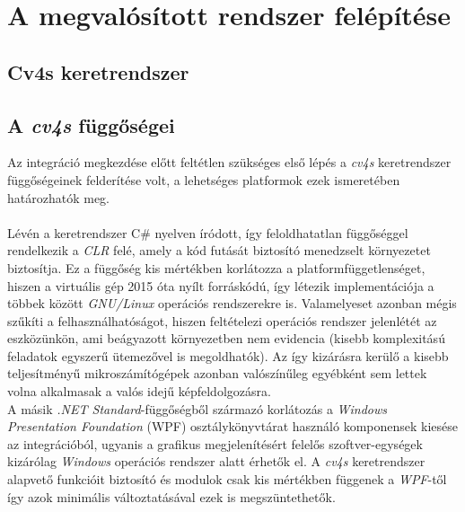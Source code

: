 \chapter{A megvalósított rendszer felépítése} \label{architektura_fejezet}

\section{Cv4s keretrendszer} \label{cv4s_keretrendszer}

\section{A \emph{cv4s} függőségei} \label{fuggosegek}

Az integráció megkezdése előtt feltétlen szükséges első lépés a \emph{cv4s} keretrendszer függőségeinek felderítése volt, a lehetséges platformok ezek ismeretében határozhatók meg. \\
\\
Lévén a keretrendszer C\# nyelven íródott, így feloldhatatlan függőséggel rendelkezik a \textit{CLR} felé, amely a kód futását biztosító menedzselt környezetet biztosítja. Ez a függőség kis mértékben korlátozza a platformfüggetlenséget, hiszen a virtuális gép 2015 óta nyílt forráskódú, így létezik implementációja a többek között \emph{GNU/Linux} operációs rendszerekre is. Valamelyeset azonban mégis szűkíti a felhasználhatóságot, hiszen feltételezi operációs rendszer jelenlétét az eszközünkön, ami beágyazott környezetben nem evidencia (kisebb komplexitású feladatok egyszerű ütemezővel is megoldhatók). Az így kizárásra kerülő a kisebb teljesítményű mikroszámítógépek azonban valószínűleg egyébként sem lettek volna alkalmasak a valós idejű képfeldolgozásra. \\
A másik \emph{.NET Standard}-függőségből származó korlátozás a \textit{Windows Presentation Foundation} (WPF) osztálykönyvtárat használó komponensek kiesése az integrációból, ugyanis a grafikus megjelenítésért felelős szoftver-egységek kizárólag \textit{Windows} operációs rendszer alatt érhetők el. A \emph{cv4s} keretrendszer alapvető funkcióit biztosító  és  modulok csak kis mértékben függenek a \emph{WPF}-től így azok minimális változtatásával ezek is megszüntethetők.\\
\\

